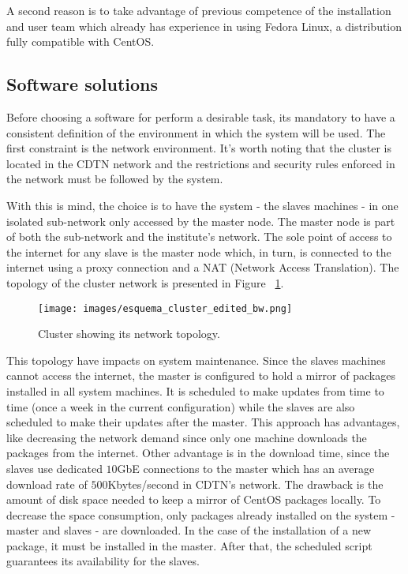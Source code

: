 \documentclass[twoside,a4paper,12pt,english]{inac17}
\begin{document}
A second reason is to take advantage of previous competence of the installation and user team which already has experience
in using Fedora Linux, a distribution fully compatible with CentOS.

\subsection{Software solutions}

Before choosing a software for perform a desirable task, its mandatory to have a consistent definition of the environment
in which the system will be used. The first constraint is the network environment. It's worth noting that the cluster is
located in the CDTN network and the restrictions and security rules enforced in the network must be followed by the system.

With this is mind, the choice is to have the system - the slaves machines - in one isolated sub-network only accessed by
the master node. The master node is part of both the sub-network and the institute's network. The sole point of access to the
internet for any slave is the master node which, in turn, is connected to the internet using a proxy connection and a
NAT (Network Access Translation). The topology of the cluster network is presented in Figure ~\ref{fig:esquema-cluster}.

\begin{figure}[h] %
  \centering\texttt{[image: images/esquema\_cluster\_edited\_bw.png]}
  \caption{Cluster showing its network topology.}
  \label{fig:esquema-cluster}
\end{figure}

This topology have impacts on system maintenance. Since the slaves machines cannot access the internet, the
master is configured to hold a mirror of packages installed in all system machines. It is scheduled to make
updates from time to time (once a week in the current configuration) while the slaves are also scheduled to
make their updates after the master. This approach has advantages, like decreasing the network demand since only
one machine downloads the packages from the internet. Other advantage is in the download time, since the slaves
use dedicated $10$GbE connections to the master which has an average download rate of $500$Kbytes/second in
CDTN's network. The drawback is the amount of disk space needed to keep a mirror of CentOS packages locally.
To decrease the space consumption, only packages already installed on the system - master and slaves - are
downloaded. In the case of the installation of a new package, it must be installed in the master. After that,
the scheduled script guarantees its availability for the slaves.
\end{document}
